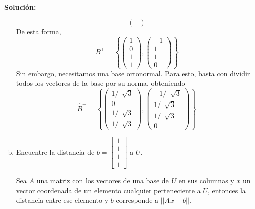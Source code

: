 \documentclass[12pt]{article}
\newenvironment{solucion}
{\begin{mdframed}[backgroundcolor=black!10]
		{\bf Solución:}\\
	}
	{
	\end{mdframed}
}
\newenvironment{preguntas}
{\begin{enumerate}\itemsep12pt
	}
	{
	\end{enumerate}
}
\begin{document}
\begin{preguntas}
\begin{solucion}
\begin{enumerate}[a)]
$$\begin{pmatrix}
			\end{pmatrix} $$
			De esta forma,
			$$B^{\perp} = \left\{\begin{pmatrix}
			1 \\ 0 \\ 1 \\ 1
			\end{pmatrix}, \begin{pmatrix}
			-1 \\ 1 \\ 1 \\ 0
			\end{pmatrix}\right\}$$
			Sin embargo, necesitamos una base ortonormal. Para esto, basta con dividir todos los vectores de la base por su norma, obteniendo
			$$\hat{B}^{\perp} = \left\{\begin{pmatrix}
			1/\ \sqrt[]{3} \\ 0 \\ 1/\ \sqrt[]{3} \\ 1/\ \sqrt[]{3}
			\end{pmatrix}, \begin{pmatrix}
			-1/\ \sqrt[]{3} \\ 1/\ \sqrt[]{3} \\ 1/\ \sqrt[]{3} \\ 0
			\end{pmatrix}\right\}$$
\item Encuentre la distancia de $b = 
			\begin{bmatrix}1\\1\\1\\1\end{bmatrix}$ a $U$.
			
			Sea $A$ una matriz con los vectores de una base de $U$ en sus columnas y $x$ un vector coordenada de un elemento cualquier perteneciente a $U$, entonces la distancia entre ese elemento y $b$ corresponde a $||Ax-b||$.
			

\end{enumerate}
\end{solucion}
\end{preguntas}
\end{document}
